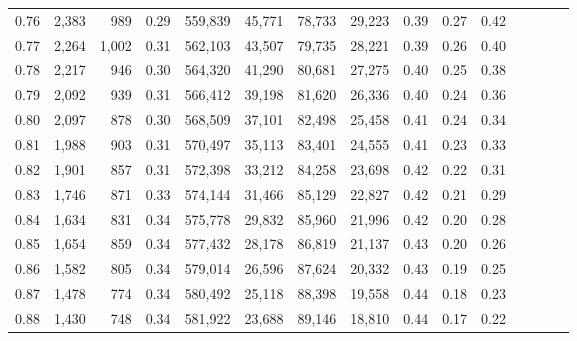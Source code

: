 \begin{tabular}{rrrcrrrrrrrrrrr}
0.76 &   2,383 &     989 &                                       0.29 &  559,839 &   45,771 &   78,733 &   29,223 &  0.39 &  0.27 &                         0.42 \\
0.77 &   2,264 &   1,002 &                                       0.31 &  562,103 &   43,507 &   79,735 &   28,221 &  0.39 &  0.26 &                         0.40 \\
0.78 &   2,217 &     946 &                                       0.30 &  564,320 &   41,290 &   80,681 &   27,275 &  0.40 &  0.25 &                         0.38 \\
0.79 &   2,092 &     939 &                                       0.31 &  566,412 &   39,198 &   81,620 &   26,336 &  0.40 &  0.24 &                         0.36 \\
0.80 &   2,097 &     878 &                                       0.30 &  568,509 &   37,101 &   82,498 &   25,458 &  0.41 &  0.24 &                         0.34 \\
0.81 &   1,988 &     903 &                                       0.31 &  570,497 &   35,113 &   83,401 &   24,555 &  0.41 &  0.23 &                         0.33 \\
0.82 &   1,901 &     857 &                                       0.31 &  572,398 &   33,212 &   84,258 &   23,698 &  0.42 &  0.22 &                         0.31 \\
0.83 &   1,746 &     871 &                                       0.33 &  574,144 &   31,466 &   85,129 &   22,827 &  0.42 &  0.21 &                         0.29 \\
0.84 &   1,634 &     831 &                                       0.34 &  575,778 &   29,832 &   85,960 &   21,996 &  0.42 &  0.20 &                         0.28 \\
0.85 &   1,654 &     859 &                                       0.34 &  577,432 &   28,178 &   86,819 &   21,137 &  0.43 &  0.20 &                         0.26 \\
0.86 &   1,582 &     805 &                                       0.34 &  579,014 &   26,596 &   87,624 &   20,332 &  0.43 &  0.19 &                         0.25 \\
0.87 &   1,478 &     774 &                                       0.34 &  580,492 &   25,118 &   88,398 &   19,558 &  0.44 &  0.18 &                         0.23 \\
0.88 &   1,430 &     748 &                                       0.34 &  581,922 &   23,688 &   89,146 &   18,810 &  0.44 &  0.17 &                         0.22 \\

\end{tabular}
